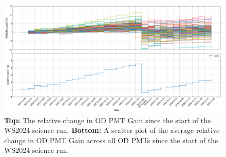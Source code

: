 \begin{figure}[ht!]
    \centering
    \includegraphics[width=\textwidth]{figures/ODCommissioning/RelativegainOverTime_AllPMTs_Both_Full_WS2024.pdf}
    \caption[The relative change in OD PMT Gain since the start of the WS2024 science run.]{\textbf{Top:} The relative change in OD PMT Gain since the start of the WS2024 science run. \textbf{Bottom:} A scatter plot of the average relative change in OD PMT Gain across all OD PMTs since the start of the WS2024 science run.}
    \label{fig:ODCommissioning/RelativeGain_WS2024}
\end{figure}
\iffalse

